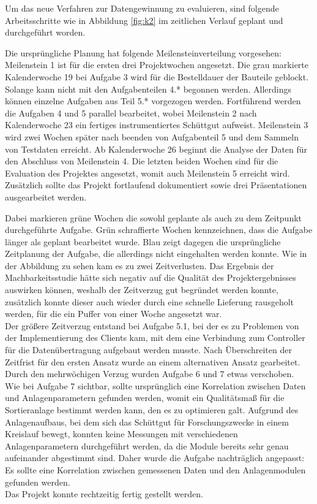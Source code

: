 Um das neue Verfahren zur Datengewinnung zu evaluieren, sind folgende Arbeitsschritte wie in Abbildung \ref{fig:k2} im zeitlichen Verlauf geplant und durchgeführt worden.

Die ursprüngliche Planung hat folgende Meilensteinverteilung vorgesehen: Meilenstein 1 ist für die ersten drei Projektwochen angesetzt. Die grau markierte Kalenderwoche 19 bei Aufgabe 3 wird für die Bestelldauer der Bauteile geblockt. Solange kann nicht mit den Aufgabenteilen 4.* begonnen werden. Allerdings können einzelne Aufgaben aus Teil 5.* vorgezogen werden. Fortführend werden die Aufgaben 4 und 5 parallel bearbeitet, wobei Meilenstein 2 nach Kalenderwoche 23 ein fertiges instrumentiertes Schüttgut aufweist. Meilenstein 3 wird zwei Wochen später nach beenden von Aufgabenteil 5 und dem Sammeln von Testdaten erreicht. Ab Kalenderwoche 26 beginnt die Analyse der Daten für den Abschluss von Meilenstein 4. Die letzten beiden Wochen sind für die Evaluation des Projektes angesetzt, womit auch Meilenstein 5 erreicht wird. Zusätzlich sollte das Projekt fortlaufend dokumentiert sowie drei Präsentationen ausgearbeitet werden.

Dabei markieren grüne Wochen die sowohl geplante als auch zu dem Zeitpunkt durchgeführte Aufgabe. Grün schraffierte Wochen kennzeichnen, dass die Aufgabe länger als geplant bearbeitet wurde. Blau zeigt dagegen die ursprüngliche Zeitplanung der Aufgabe, die allerdings nicht eingehalten werden konnte. Wie in der Abbildung zu sehen kam es zu zwei Zeitverlusten. Das Ergebnis der Machbarkeitsstudie hätte sich negativ auf die Qualität des Projektergebnisses auswirken können, weshalb der Zeitverzug gut begründet werden konnte, zusätzlich konnte dieser auch wieder durch eine schnelle Lieferung rausgeholt werden, für die ein Puffer von einer Woche angesetzt war. \\
Der größere Zeitverzug entstand bei Aufgabe 5.1, bei der es zu Problemen von der Implementierung des Clients kam, mit dem eine Verbindung zum Controller für die Datenübertragung aufgebaut werden musste. Nach Überschreiten der Zeitfrist für den ersten Ansatz wurde an einem alternativen Ansatz gearbeitet. Durch den mehrwöchigen Verzug wurden Aufgabe 6 und 7  etwas verschoben. \\
Wie bei Aufgabe 7 sichtbar, sollte ursprünglich eine Korrelation zwischen Daten und Anlagenparametern gefunden werden, womit ein Qualitätsmaß für die Sortieranlage bestimmt werden kann, den es zu optimieren galt. Aufgrund des Anlagenaufbaus, bei dem sich das Schüttgut für Forschungszwecke in einem Kreislauf bewegt, konnten keine Messungen mit verschiedenen Anlagenparametern durchgeführt werden, da die Module bereits sehr genau aufeinander abgestimmt sind. Daher wurde die Aufgabe nachträglich angepasst: Es sollte eine Korrelation zwischen gemessenen Daten und den Anlagenmodulen gefunden werden. \\
Das Projekt konnte rechtzeitig fertig gestellt werden.

